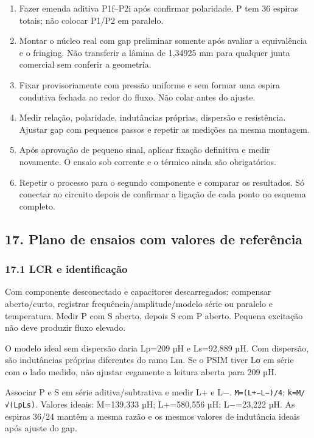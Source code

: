 \documentclass[
]{article}
\begin{document}
\begin{enumerate}
  final: 14,30 mm no modelo. Se exceder a folga disponível, não
  pressionar para fechar.
\item
  Fazer emenda aditiva P1f--P2i após confirmar polaridade. P tem 36
  espiras totais; não colocar P1/P2 em paralelo.
\item
  Montar o núcleo real com gap preliminar somente após avaliar a
  equivalência e o fringing. Não transferir a lâmina de 1,34925 mm para
  qualquer junta comercial sem conferir a geometria.
\item
  Fixar provisoriamente com pressão uniforme e sem formar uma espira
  condutiva fechada ao redor do fluxo. Não colar antes do ajuste.
\item
  Medir relação, polaridade, indutâncias próprias, dispersão e
  resistência. Ajustar gap com pequenos passos e repetir as medições na
  mesma montagem.
\item
  Após aprovação de pequeno sinal, aplicar fixação definitiva e medir
  novamente. O ensaio sob corrente e o térmico ainda são obrigatórios.
\item
  Repetir o processo para o segundo componente e comparar os resultados.
  Só conectar ao circuito depois de confirmar a ligação de cada ponto no
  esquema completo.
\end{enumerate}

\subsection{17. Plano de ensaios com valores de
referência}\label{plano-de-ensaios-com-valores-de-referuxeancia}

\subsubsection{17.1 LCR e
identificação}\label{lcr-e-identificauxe7uxe3o}

Com componente desconectado e capacitores descarregados: compensar
aberto/curto, registrar frequência/amplitude/modelo série ou paralelo e
temperatura. Medir P com S aberto, depois S com P aberto. Pequena
excitação não deve produzir fluxo elevado.

O modelo ideal sem dispersão daria Lp=209 µH e Ls=92,889 µH. Com
dispersão, são indutâncias próprias diferentes do ramo Lm. Se o PSIM
tiver Lσ em série com o lado medido, não ajustar cegamente a leitura
aberta para 209 µH.

Associar P e S em série aditiva/subtrativa e medir L+ e L−.
\texttt{M=(L+−L−)/4}; \texttt{k=M/√(LpLs)}. Valores ideais: M=139,333
µH; L+=580,556 µH; L−=23,222 µH. As espiras 36/24 mantêm a mesma razão e
os mesmos valores de indutância ideais após ajuste do gap.
\end{document}
